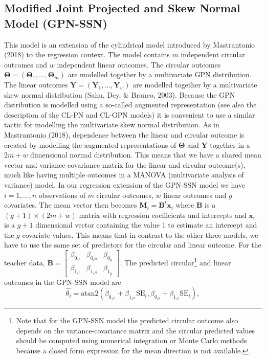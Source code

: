 \documentclass[man,mask]{apa6}
\let\rmarkdownfootnote\footnote%
\def\footnote{\protect\rmarkdownfootnote}
\begin{document}
\vspace{-0.75cm}
\subsection{Modified Joint Projected and Skew Normal Model (GPN-SSN)}\label{CL-GPN_multivariate}
\vspace{-0.75cm}

This model is an extension of the cylindrical model introduced by
Mastrantonio (2018) to the regression context. The model contains \(m\)
independent circular outcomes and \(w\) independent linear outcomes. The
circular outcomes \(\boldsymbol{\Theta} = (\boldsymbol{\Theta}_1, \dots,  \boldsymbol{\Theta}_m)\) are modelled together by a multivariate GPN
distribution. The linear outcomes \(\boldsymbol{Y} = (\boldsymbol{Y}_1, \dots,  \boldsymbol{Y}_w)\) are modelled together by a multivariate skew normal
distribution (Sahu, Dey, \& Branco, 2003). Because the GPN distribution is modelled
using a so-called augmented representation (see also the description of the
CL-PN and CL-GPN models) it is convenient to use a similar tactic for
modelling the multivariate skew normal distribution. As in
Mastrantonio (2018), dependence between the linear and circular outcome is
created by modelling the augmented representations of \(\boldsymbol{\Theta}\)
and \(\boldsymbol{Y}\) together in a \(2m + w\) dimensional normal
distribution.\newline
\indent This means that we have a shared mean vector and variance-covariance
matrix for the linear and circular outcome(s), much like having multiple
outcomes in a MANOVA (multivariate analysis of variance) model. In our
regression extension of the GPN-SSN model we have \(i = 1, \dots, n\)
observations of \(m\) circular outcomes, \(w\) linear outcomes and \(g\)
covariates. The mean vector then becomes \(\boldsymbol{M}_i = \boldsymbol{B}^t\boldsymbol{x}_i\) where \(\boldsymbol{B}\) is a \((g + 1) \times (2m + w)\) matrix with regression coefficients and intercepts and
\(\boldsymbol{x}_i\) is a \(g + 1\) dimensional vector containing the value 1 to
estimate an intercept and the \(g\) covariate values. This means that in contrast
to the other three models, we have to use the same set of predictors for the
circular and linear outcome.\newline
\indent For the teacher data, \(\boldsymbol{B} = \begin{bmatrix} \beta_{0_{s^{I}}} & \beta_{0_{s^{II}}} & \beta_{0_{y}}\\ \beta_{1_{s^{I}}} & \beta_{1_{s^{II}}} & \beta_{1_{y}} \end{bmatrix}\). The predicted circular\footnote{Note that for the  GPN-SSN model the predicted circular outcome also depends on the variance-covariance matrix and the circular predicted values should be computed using numerical integration or Monte Carlo methods because a closed form expression for the mean direction is not available.} and
linear outcomes in the GPN-SSN model are
\[\hat{\theta_i} = \mbox{atan2}(\beta_{0_{s^{II}}} +
\beta_{1_{s^{II}}}\text{SE}_i,\beta_{0_{s^{I}}} +
\beta_{1_{s^{I}}}\text{SE}_i),\]
\end{document}
